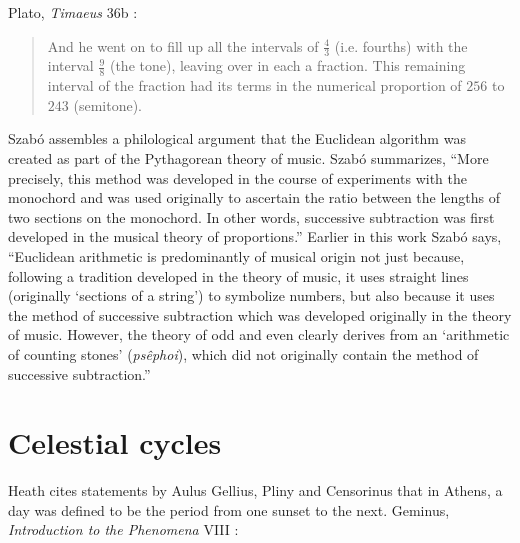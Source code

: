 \documentclass{article}
\begin{document}
Plato, {\em Timaeus} 36b \cite[pp.~71--72]{timaeus}:

\begin{quote}
And he went on to fill up all the intervals of $\frac{4}{3}$ (i.e. fourths) with the interval $\frac{9}{8}$ (the tone), leaving over in each a fraction.
This remaining interval of the fraction had its terms in the numerical proportion of $256$ to $243$ (semitone).
\end{quote}

Szab\'o \cite{szabo} assembles a philological argument that the Euclidean algorithm was created
as part of the Pythagorean theory of music. Szab\'o \cite[p.~136, Chapter 2.8]{szabo} summarizes, ``More precisely, 
this method was developed in the course of experiments with the monochord and was used originally to ascertain the ratio
between the lengths of two sections on the monochord. In other words, successive subtraction was first developed in the musical
theory of proportions.'' Earlier in this work Szab\'o \cite[pp.~28--29]{szabo} says, ``Euclidean arithmetic is predominantly of musical origin
not just because, following a tradition developed in the theory of music, it uses straight lines (originally `sections of a string') to symbolize numbers, but also because
it uses the method of successive subtraction which was developed originally in the theory of music. However, the theory of odd and even clearly derives from
an `arithmetic of counting stones' ({\em psêphoi}), which did not originally contain the method of successive subtraction.''





\section{Celestial cycles}
Heath \cite[p.~284]{aristarchus} cites statements by
Aulus Gellius, Pliny and Censorinus that in Athens, 
a day was defined to be the period from one sunset to the next.
Geminus, {\em Introduction to the Phenomena} VIII \cite[pp.~284--285]{aristarchus}:
\end{document}
